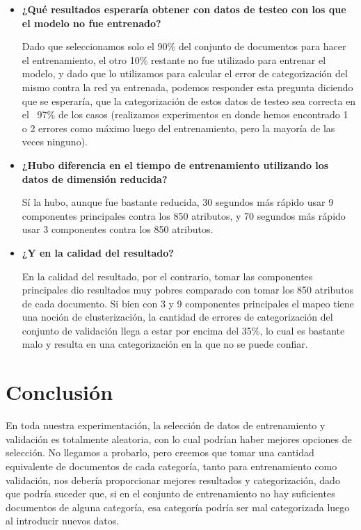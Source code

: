 \begin{itemize}
\item \textbf{¿Qué resultados esperaría obtener con datos de testeo con los que el modelo no fue entrenado?}

Dado que seleccionamos solo el 90\% del conjunto de documentos para hacer el entrenamiento, el otro 10\% restante no fue utilizado 
para entrenar el modelo, y dado que lo utilizamos para calcular el error de categorización del mismo contra la red ya entrenada, 
podemos responder esta pregunta diciendo que se esperaría, que la categorización de estos datos de testeo sea correcta en el 
~97\% de los casos (realizamos experimentos en donde hemos encontrado 1 o 2 errores como máximo luego del entrenamiento, pero la 
mayoría de las veces ninguno).

\item \textbf{¿Hubo diferencia en el tiempo de entrenamiento utilizando los datos de dimensión reducida?}

Sí la hubo, aunque fue bastante reducida, 30 segundos más rápido usar 9 componentes principales contra los 850 atributos, y 70 segundos 
más rápido usar 3 componentes contra los 850 atributos. 

\item \textbf{¿Y en la calidad del resultado?}

En la calidad del resultado, por el contrario, tomar las componentes principales dio resultados muy pobres comparado con 
tomar los 850 atributos de cada documento. Si bien con 3 y 9 componentes principales el mapeo tiene una noción de clusterización,
la cantidad de errores de categorización del conjunto de validación llega a estar por encima del 35\%, lo cual es bastante malo y
resulta en una categorización en la que no se puede confiar. 

\end{itemize}

\newpage
\section{Conclusión}

En toda nuestra experimentación, la selección de datos de entrenamiento y validación es totalmente aleatoria, con lo cual podrían haber
mejores opciones de selección. No llegamos a probarlo, pero creemos que tomar una cantidad equivalente de documentos de cada categoría, 
tanto para entrenamiento como validación, nos debería proporcionar mejores resultados y categorización, dado que podría suceder que, 
si en el conjunto de entrenamiento no hay suficientes documentos de alguna categoría, esa categoría podría ser mal categorizada luego al
introducir nuevos datos.
